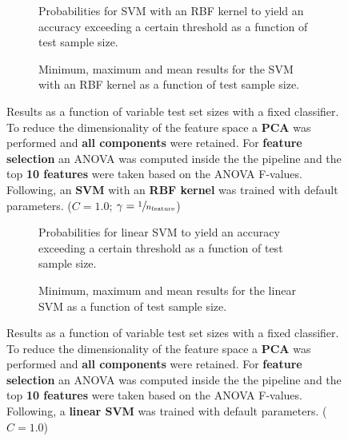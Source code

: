 \begin{figure}
    \captionsetup[subfigure]{justification=justified,singlelinecheck=false}
    \begin{subfigure}[t]{0.61\textwidth}
        
        \caption{Probabilities for SVM with an RBF kernel to yield an accuracy exceeding a certain threshold as a function of test sample size.}
    \end{subfigure}
    \hspace{3.0mm}
    \begin{subfigure}[t]{0.34\textwidth}
        
        \caption{Minimum, maximum and mean results for the SVM with an RBF kernel as a function of test sample size.}
    \end{subfigure}
    \caption[Effects of varying test sample size. SVM (kernel = RBF); Preprocessing: PCA ($n_\text{components} = \text{all}$); ANOVA feature selection ($k_\text{best} = \num{10}$)]{Results as a function of variable test set sizes with a fixed classifier. To reduce the dimensionality of the feature space a \textbf{PCA} was performed and \textbf{all components} were retained. For \textbf{feature selection} an ANOVA was computed inside the the pipeline and the top \textbf{10 features} were taken based on the ANOVA F-values. Following, an \textbf{{SVM}} with an \textbf{{RBF kernel}} was trained with default parameters. ($C=\num{1.0}$; $\gamma=\sfrac{1}{n_\text{feature}}$)}
    \label{fig:PCA_all_components_10_best_selected_SVC}
\end{figure}

\begin{figure}
    \captionsetup[subfigure]{justification=justified,singlelinecheck=false}
    \begin{subfigure}[t]{0.61\textwidth}
        
        \caption{Probabilities for linear SVM to yield an accuracy exceeding a certain threshold as a function of test sample size.}
    \end{subfigure}
    \hspace{3.0mm}
    \begin{subfigure}[t]{0.34\textwidth}
        
        \caption{Minimum, maximum and mean results for the linear SVM as a function of test sample size.}
    \end{subfigure}
    \caption[Effects of varying test sample size. Linear SVM; Preprocessing: PCA ($n_\text{components} = \text{all}$); ANOVA feature selection ($k_\text{best} = \num{10}$)]{Results as a function of variable test set sizes with a fixed classifier. To reduce the dimensionality of the feature space a \textbf{PCA} was performed and \textbf{all components} were retained. For \textbf{feature selection} an ANOVA was computed inside the the pipeline and the top \textbf{10 features} were taken based on the ANOVA F-values. Following, a \textbf{{linear SVM}} was trained with default parameters. ($C=\num{1.0}$)}
    \label{fig:PCA_all_components_10_best_selected_LinearSVC}
\end{figure}

